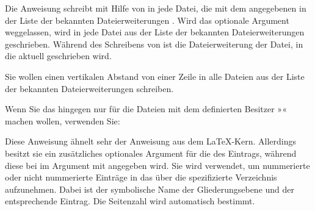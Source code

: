 \begin{Declaration}
\end{Declaration}
Die Anweisung  schreibt  mit Hilfe von
%
 in jede Datei, die mit dem angegebenen
 in der Liste der bekannten Dateierweiterungen . Wird das optionale Argument weggelassen, wird in jede
Datei aus der Liste der bekannten Dateierweiterungen geschrieben. Während des Schreibens von  ist
 die
Dateierweiterung der Datei, in die aktuell geschrieben wird.
\begin{Example}
  Sie wollen einen vertikalen Abstand von einer Zeile in alle Dateien aus der
  Liste der bekannten Dateierweiterungen schreiben.
\begin{lstcode}
  \addtoeachtocfile{%
    \protect\addvspace{\protect\baselineskip}%
  }%
\end{lstcode}
  Wenn Sie das hingegen nur für die Dateien mit dem definierten Besitzer
  »« machen wollen, verwenden Sie:
\begin{lstcode}
  \addtoeachtocfile[foo]{%
    \protect\addvspace{\protect\baselineskip}%
  }
\end{lstcode}%
\end{Example}%
%
\EndIndexGroup


\begin{Declaration}
\end{Declaration}
Diese Anweisung ähnelt sehr der Anweisung
 aus dem
\LaTeX-Kern. Allerdings besitzt sie ein zusätzliches optionales Argument für
die  des Eintrags, während diese bei
 im Argument  mit angegeben wird. Sie
wird verwendet, um nummerierte oder nicht nummerierte Einträge in das über die
 spezifizierte Verzeichnis aufzunehmen. Dabei ist
 der symbolische Name der Gliederungsebene und  der
entsprechende Eintrag. Die Seitenzahl wird automatisch bestimmt.

